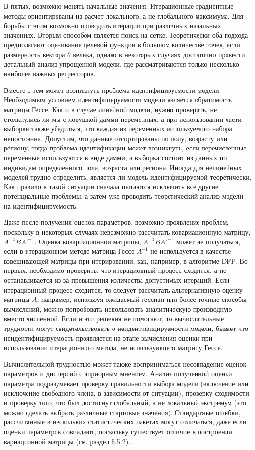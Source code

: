 В-пятых, возможно менять начальные значения. Итерационные градиентные методы ориентированы на расчет локального, а не глобального максимума. Для борьбы с этим возможно проводить итерации  при различных начальных значениях. Вторым способом является поиск на сетке. Теоретически оба подхода предполагают оценивание целевой функции в большом количестве точек, если  размерность вектора $\theta$ велика, однако в некоторых случаях достаточно провести детальный анализ упрощенной модели, где рассматриваются только несколько наиболее важных регрессоров.

Вместе с тем может возникнуть проблема идентифицируемости модели. Необходимым условием идентифицируемости модели является обратимость матрицы Гессе. Как и в случае линейной модели, нужно проверить, не столкнулись ли мы с ловушкой дамми-переменных, а при использовании части выборки также убедиться, что каждая из переменных используемого набора непостоянна.  Допустим, что данные отсортированы по полу, возрасту или региону, тогда проблема идентификации может возникнуть, если перечисленные переменные используются в виде дамми, а выборка состоит из данных по индивидам определенного пола, возраста или региона. Иногда для нелинейных моделей трудно определить, является ли модель идентифицируемой теоретически. Как правило в такой ситуации сначала пытаются исключить все другие потенциальные проблемы, а затем уже проводить теоретический анализ модели на идентифицируемость.

Даже после получения оценок параметров, возможно проявление проблем, поскольку в некоторых случаях невозможно рассчитать ковариационную матрицу, $A^{-1}BA'^{-1}$. Оценка ковариационной матрицы, $A^{-1}BA'^{-1}$ может не получаться, если в итерационном методе матрица Гессе $A^{-1}$ не используется в качестве взвешивающей матрицы при итерировании, как, например, в алгоритме DFP. Во-первых, необходимо проверить, что итерационный процесс сходится, а не останавливается из-за превышения количества допустимых итераций. Если итерационный процесс сходится, то следует рассчитать альтернативную оценку матрицы $A$, например, используя ожидаемый гессиан или более точные способы вычислений, можно попробовать использовать аналитическую производную вместо численной. Если и эти решения не помогают, то вычислительные трудности могут свидетельствовать о неидентифицируемости модели, бывает что неидентифицируемость проявляется на этапе вычисления оценки при использовании итерационного метода, не использующего матрицу Гессе.

Вычислительной трудностью может также восприниматься несовпадение оценок параметров и дисперсий с априорным мнением. Анализ полученной оценки параметра подразумевает проверку правильности выбора модели (включение или исключение свободного члена, в зависимости от ситуации), проверку сходимости и проверку того, что был достигнут глобальный, а не локальный экстремум (это можно сделать выбрать различные стартовые значения). Стандартные ошибки, рассчитанные в нескольких статистических пакетах могут отличаться, даже если оценки параметров совпадают, поскольку существует отличие в построении вариационной матрицы (см. раздел 5.5.2).

